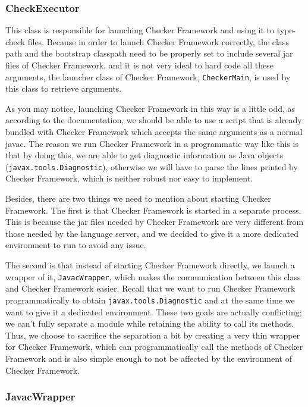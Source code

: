 \documentclass{article}
\begin{document}
\subsubsection{CheckExecutor}

This class is responsible for launching Checker Framework and using it to type-check files. Because in order to launch Checker Framework correctly, the class path and the bootstrap classpath need to be properly set to include several jar files of Checker Framework, and it is not very ideal to hard code all these arguments, the launcher class of Checker Framework, \verb|CheckerMain|, is used by this class to retrieve arguments.

As you may notice, launching Checker Framework in this way is a little odd, as according to the documentation, we should be able to use a script that is already bundled with Checker Framework which accepts the same arguments as a normal javac. The reason we run Checker Framework in a programmatic way like this is that by doing this, we are able to get diagnostic information as Java objects (\verb|javax.tools.Diagnostic|), otherwise we will have to parse the lines printed by Checker Framework, which is neither robust nor easy to implement.

Besides, there are two things we need to mention about starting Checker Framework. The first is that Checker Framework is started in a separate process. This is because the jar files needed by Checker Framework are very different from those needed by the language server, and we decided to give it a more dedicated environment to run to avoid any issue.

The second is that instead of starting Checker Framework directly, we launch a wrapper of it, \verb|JavacWrapper|, which makes the communication between this class and Checker Framework easier.  Recall that we want to run Checker Framework programmatically to obtain \verb|javax.tools.Diagnostic| and at the same time we want to give it a dedicated environment. These two goals are actually conflicting; we can't fully separate a module while retaining the ability to call its methods.  Thus, we choose to sacrifice the separation a bit by creating a very thin wrapper for Checker Framework, which can programmatically call the methods of Checker Framework and is also simple enough to not be affected by the environment of Checker Framework.

\subsubsection{JavacWrapper}
\end{document}
